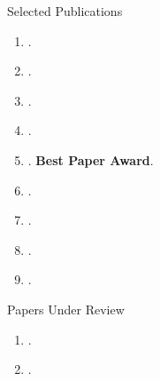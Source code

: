 \documentclass{resume} %
\begin{document}
\begin{rSection}{Selected Publications}
    \def\FormatName#1{%
    \def\myname{Junyan Su}%
    \edef\name{#1}%
    \ifx\name\myname
      \underline{#1}%
    \else
       #1%
    \fi
    }
    \begin{enumerate}
        \item {}.
         \item {}.
         \item {}.
         \item {}.
         \item {}. \textbf{Best Paper Award}.
        \item {}.
         \item {}.
        \item {}.
        \item {}.
    \end{enumerate}
\end{rSection}

\begin{rSection}{Papers Under Review}
    \def\FormatName#1{%
    \def\myname{Junyan Su}%
    \edef\name{#1}%
    \ifx\name\myname
      \underline{#1}%
    \else
       #1%
    \fi
    }
    \begin{enumerate}
         \item {}.
         \item {}.
    \end{enumerate}
\end{rSection}
\end{document}
